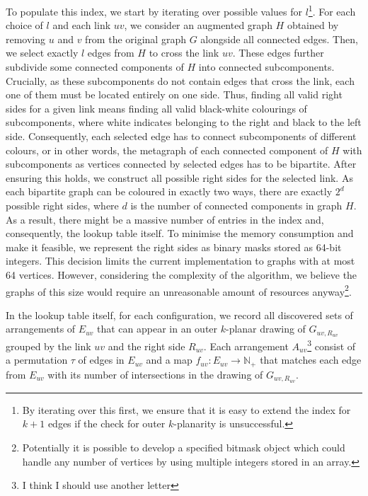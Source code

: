 To populate this index, we start by iterating over possible values for \(l\)\footnote{By iterating over this first, we ensure that it is easy to extend the index for \(k+1\) edges if the check for outer \(k\)-planarity is unsuccessful.}. For each choice of \(l\) and each link \(uv\), we consider an augmented graph \(H\) obtained by removing \(u\) and \(v\) from the original graph \(G\) alongside all connected edges. Then, we select exactly \(l\) edges from \(H\) to cross the link \(uv\). These edges further subdivide some connected components of \(H\) into connected subcomponents. Crucially, as these subcomponents do not contain edges that cross the link, each one of them must be located entirely on one side. Thus, finding all valid right sides for a given link means finding all valid black-white colourings of subcomponents, where white indicates belonging to the right and black to the left side. Consequently, each selected edge has to connect subcomponents of different colours, or in other words, the metagraph of each connected component of \(H\) with subcomponents as vertices connected by selected edges has to be bipartite. After ensuring this holds, we construct all possible right sides for the selected link. As each bipartite graph can be coloured in exactly two ways, there are exactly \(2^d\) possible right sides, where \(d\) is the number of connected components in graph \(H\). As a result, there might be a massive number of entries in the index and, consequently, the lookup table itself. To minimise the memory consumption and make it feasible, we represent the right sides as binary masks stored as 64-bit integers. This decision limits the current implementation to graphs with at most 64 vertices. However, considering the complexity of the algorithm, we believe the graphs of this size would require an unreasonable amount of resources anyway\footnote{Potentially it is possible to develop a specified bitmask object which could handle any number of vertices by using multiple integers stored in an array.}.

In the lookup table itself, for each configuration, we record all discovered sets of arrangements of \(E_{uv}\) that can appear in an outer \(k\)-planar drawing of \(G_{uv, R_{uv}}\) grouped by the link \(uv\) and the right side \(R_{uv}\). Each arrangement \(A_{uv}\)\footnote{I think I should use another letter} consist of a permutation \(\tau\) of edges in \(E_{uv}\) and a map \(f_{uv}:E_{uv}\rightarrow \mathbb{N}_+\) that matches each edge from \(E_{uv}\) with its number of intersections in the drawing of \(G_{uv, R_{uv}}\).

